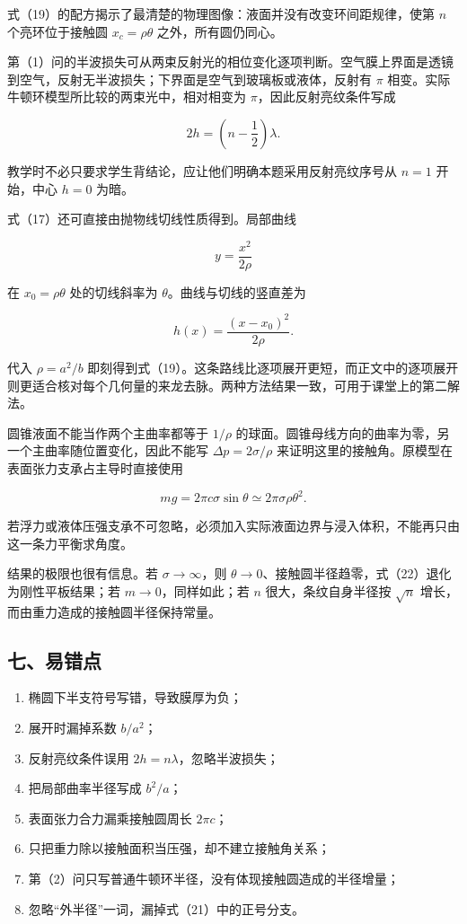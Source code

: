 \documentclass[12pt,a4paper,UTF8]{ctexart}
\newcommand{\tightlist}{\setlength{\itemsep}{0pt}\setlength{\parskip}{0pt}}
\begin{document}
式（19）的配方揭示了最清楚的物理图像：液面并没有改变环间距规律，使第
\(n\) 个亮环位于接触圆 \(x_c=\rho\theta\) 之外，所有圆仍同心。

第（1）问的半波损失可从两束反射光的相位变化逐项判断。空气膜上界面是透镜到空气，反射无半波损失；下界面是空气到玻璃板或液体，反射有
\(\pi\) 相变。实际牛顿环模型所比较的两束光中，相对相变为
\(\pi\)，因此反射亮纹条件写成

\[
2h=\left(n-\frac12\right)\lambda.
\]

教学时不必只要求学生背结论，应让他们明确本题采用反射亮纹序号从 \(n=1\)
开始，中心 \(h=0\) 为暗。

式（17）还可直接由抛物线切线性质得到。局部曲线

\[
y=\frac{x^2}{2\rho}
\]

在 \(x_0=\rho\theta\) 处的切线斜率为 \(\theta\)。曲线与切线的竖直差为

\[
h(x)
=\frac{(x-x_0)^2}{2\rho}.
\]

代入 \(\rho=a^2/b\)
即刻得到式（19）。这条路线比逐项展开更短，而正文中的逐项展开则更适合核对每个几何量的来龙去脉。两种方法结果一致，可用于课堂上的第二解法。

圆锥液面不能当作两个主曲率都等于 \(1/\rho\)
的球面。圆锥母线方向的曲率为零，另一个主曲率随位置变化，因此不能写
\(\Delta p=2\sigma/\rho\)
来证明这里的接触角。原模型在表面张力支承占主导时直接使用

\[mg=2\pi c\sigma\sin\theta\simeq2\pi\sigma\rho\theta^2.\]

若浮力或液体压强支承不可忽略，必须加入实际液面边界与浸入体积，不能再只由这一条力平衡求角度。

结果的极限也很有信息。若 \(\sigma\to\infty\)，则
\(\theta\to0\)、接触圆半径趋零，式（22）退化为刚性平板结果；若
\(m\to0\)，同样如此；若 \(n\) 很大，条纹自身半径按 \(\sqrt n\)
增长，而由重力造成的接触圆半径保持常量。

\subsection{七、易错点}\label{ux4e03ux6613ux9519ux70b9-7}

\begin{enumerate}
\def\labelenumi{\arabic{enumi}.}
\tightlist
\item
  椭圆下半支符号写错，导致膜厚为负；
\item
  展开时漏掉系数 \(b/a^2\)；
\item
  反射亮纹条件误用 \(2h=n\lambda\)，忽略半波损失；
\item
  把局部曲率半径写成 \(b^2/a\)；
\item
  表面张力合力漏乘接触圆周长 \(2\pi c\)；
\item
  只把重力除以接触面积当压强，却不建立接触角关系；
\item
  第（2）问只写普通牛顿环半径，没有体现接触圆造成的半径增量；
\item
  忽略``外半径''一词，漏掉式（21）中的正号分支。
\end{enumerate}
\end{document}
